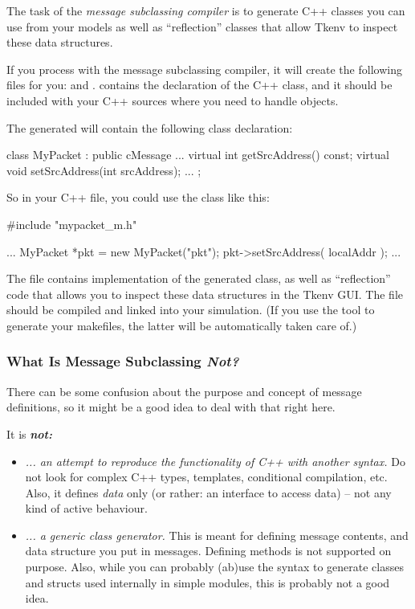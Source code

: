 The task of the \textit{message subclassing compiler} is to generate C++ classes
you can use from your models as well as ``reflection'' classes that allow
Tkenv to inspect these data structures.

If you process  with the message subclassing compiler, it will
create the following files for you:  and .
 contains the declaration of the  C++ class, and
it should be included with your C++ sources where you need to handle
 objects.

The generated  will contain the following class declaration:

\begin{cpp}
class MyPacket : public cMessage {
    ...
    virtual int getSrcAddress() const;
    virtual void setSrcAddress(int srcAddress);
    ...
};
\end{cpp}

So in your C++ file, you could use the  class like this:

\begin{cpp}
#include "mypacket_m.h"

...
MyPacket *pkt = new MyPacket("pkt");
pkt->setSrcAddress( localAddr );
...
\end{cpp}

The  file contains implementation of the generated 
class, as well as ``reflection'' code that allows you to inspect these data
structures in the Tkenv GUI. The  file should be compiled and
linked into your simulation. (If you use the  tool
to generate your makefiles, the latter will be automatically taken care of.)


\subsubsection{What Is Message Subclassing \textit{Not?}}

There can be some confusion about the purpose and
concept of message definitions, so it might be a good idea
to deal with that right here.

It is \textit{\textbf{not:}}

\begin{itemize}
  \item{\textit{... an attempt to reproduce the functionality of C++ with another
     syntax.} Do not look for complex C++ types, templates, conditional compilation, etc.
     Also, it defines \textit{data} only (or rather: an interface to access
     data) -- not any kind of active behaviour.}
  \item{\textit{... a generic class generator.} This is meant for defining message
     contents, and data structure you put in messages.
     Defining methods is not supported on purpose.
     Also, while you can probably (ab)use the syntax to
     generate classes and structs used internally in simple modules,
     this is probably not a good idea.}
\end{itemize}

